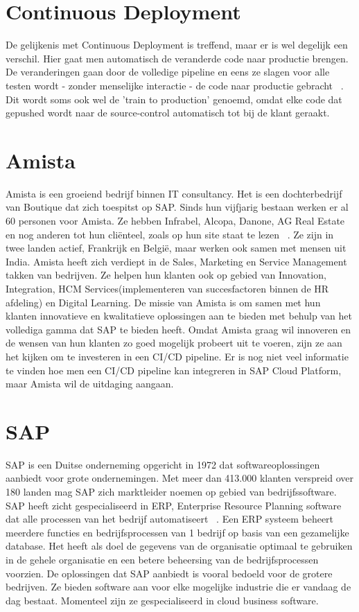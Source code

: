 \section{Continuous Deployment}
\label{sec:continuous-deployment}
    De gelijkenis met Continuous Deployment is treffend, maar er is wel degelijk een verschil.
    Hier gaat men automatisch de veranderde code naar productie brengen. De veranderingen gaan door de volledige pipeline en eens ze slagen voor alle testen wordt - zonder menselijke interactie - de code naar productie gebracht ~\autocite{Claps2015}.
    Dit wordt soms ook wel de 'train to production' genoemd, omdat elke code dat gepushed wordt naar de source-control automatisch tot bij de klant geraakt.

\section{Amista}
\label{sec:amista}
    Amista is een groeiend bedrijf binnen IT consultancy. Het is een dochterbedrijf van Boutique dat zich toespitst op SAP. Sinds hun vijfjarig bestaan werken er al 60 personen voor Amista. Ze hebben Infrabel, Alcopa, Danone, AG Real Estate en nog anderen tot hun cliënteel, zoals op hun site staat te lezen ~\autocite{Amista2018}.
    Ze zijn in twee landen actief, Frankrijk en België, maar werken ook samen met mensen uit India.
    Amista heeft zich verdiept in de Sales, Marketing en Service Management takken van bedrijven. Ze helpen hun klanten ook op gebied van Innovation, Integration, HCM Services(implementeren van succesfactoren binnen de HR afdeling) en Digital Learning.
    De missie van Amista is om samen met hun klanten innovatieve en kwalitatieve oplossingen aan te bieden met behulp van het vollediga gamma dat SAP te bieden heeft.
    Omdat Amista graag wil innoveren en de wensen van hun klanten zo goed mogelijk probeert uit te voeren, zijn ze aan het kijken om te investeren in een CI/CD pipeline. Er is nog niet veel informatie te vinden hoe men een CI/CD pipeline kan integreren in SAP Cloud Platform, maar Amista wil de uitdaging aangaan. 

\section{SAP}
\label{sec:sap}
    SAP is een Duitse onderneming opgericht in 1972 dat softwareoplossingen aanbiedt voor grote ondernemingen. Met meer dan 413.000 klanten verspreid over 180 landen mag SAP zich marktleider noemen op gebied van bedrijfssoftware.
    SAP heeft zicht gespecialiseerd in ERP, Enterprise Resource Planning software dat alle processen van het bedrijf automatiseert ~\autocite{SAPERP2019}. Een ERP systeem beheert meerdere functies en bedrijfsprocessen van 1 bedrijf op basis van een gezamelijke database. Het heeft als doel de gegevens van de organisatie optimaal te gebruiken in de gehele organisatie en een betere beheersing van de bedrijfsprocessen voorzien.
    De oplossingen dat SAP aanbiedt is vooral bedoeld voor de grotere bedrijven. Ze bieden software aan voor elke mogelijke industrie die er vandaag de dag bestaat. Momenteel zijn ze gespecialiseerd in cloud business software.

